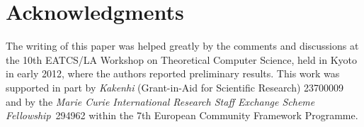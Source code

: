 \section*{Acknowledgments}

The writing of this paper was 
helped greatly by the comments and discussions at the 
10th EATCS/LA Workshop on Theoretical Computer Science, 
held in Kyoto in early 2012, 
where the authors reported preliminary results. 
This work was supported in part 
by \emph{Kakenhi} (Grant-in-Aid for Scientific Research) 23700009 
and by the \emph{Marie Curie International Research
Staff Exchange Scheme Fellowship}~294962
within the 7th European Community Framework Programme. 

